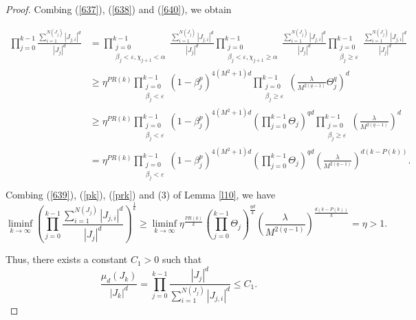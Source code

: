 \documentclass[reqno]{amsart}
\theoremstyle{plain}
\theoremstyle{definition}
\theoremstyle{remark}
\numberwithin{equation}{section} \DeclareMathOperator\intr{int}
\begin{document}
\begin{proof}
Combing (\ref{637}), (\ref{638}) and (\ref{640}), we obtain


\begin{equation*}
\begin{aligned}
\prod_{j=0}^{k-1} \frac{\sum_{i=1}^{N(J_j)}\left | J_{j,i} \right |^d }{\left | J_j \right |^d }&= \prod_{\substack{j = 0\\\beta_j<\varepsilon,\chi_{j+1}<\alpha}}^{k-1} \frac{\sum_{i=1}^{N(J_j)}\left | J_{j,i} \right |^d }{\left | J_j \right |^d }\prod_{\substack{j = 0\\\beta_j<\varepsilon,\chi_{j+1}\ge\alpha}}^{k-1} \frac{\sum_{i=1}^{N(J_j)}\left | J_{j,i} \right |^d }{\left | J_j \right |^d }\prod_{\substack{j = 0\\\beta_j\ge\varepsilon}}^{k-1} \frac{\sum_{i=1}^{N(J_j)}\left | J_{j,i} \right |^d }{\left | J_j \right |^d }\\
&\ge \eta^{PR(k)}\prod_{\substack{j = 0\\\beta_j<\varepsilon}}^{k-1}(1-\beta^p_j)^{4(M^2+1)d}\prod_{\substack{j = 0\\\beta_j\ge\varepsilon}}^{k-1}(\frac{\lambda}{M^{2(q-1)}}\Theta^q_j)^d\\
&\ge\eta^{PR(k)}\prod_{\substack{j = 0\\\beta_j<\varepsilon}}^{k-1}(1-\beta^p_j)^{4(M^2+1)d}(\prod_{j=0}^{k-1}\Theta_j )^{qd}\prod_{\substack{j = 0\\\beta_j\ge\varepsilon}}^{k-1}(\frac{\lambda}{M^{2(q-1)}})^d\\
&= \eta^{PR(k)}\prod_{\substack{j = 0\\\beta_j<\varepsilon}}^{k-1}(1-\beta^p_j)^{4(M^2+1)d}(\prod_{j=0}^{k-1}\Theta_j )^{qd}(\frac{\lambda}{M^{2(q-1)}})^{d(k-P(k))}.\\
\end{aligned}
\end{equation*}
Combing (\ref{639}), (\ref{pk}),   (\ref{prk}) and (3) of Lemma \ref{l10}, we have
\begin{equation*}
\liminf\limits_{k \to\infty} (\prod_{j=0}^{k-1} \frac{\sum_{i=1}^{N(J_j)}\left | J_{j,i} \right |^d }{\left | J_j \right |^d })^{\frac{1}{k} }\ge \liminf\limits_{k \to\infty} \eta^{\frac{PR(k)}{k}}(\prod_{j=0}^{k-1}\Theta_j )^{\frac{qd}{k}}(\frac{\lambda}{M^{2(q-1)}})^{\frac{d(k-P(k))}{k}}=\eta>1.
\end{equation*}


Thus, there exists a constant $C_1>0$ such that
\begin{equation*}
\frac{\mu_d(J_k)}{\left | J_k \right |^d }=\prod_{j=0}^{k-1}\frac{\left | J_j \right |^d}{\sum_{i=1}^{N(J_j)}\left | J_{j,i} \right |^d}\le C_1.
\end{equation*}


\end{proof}
\end{document}
